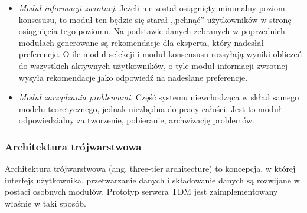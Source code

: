 \begin{itemize}
  \item \emph{Moduł informacji zwrotnej}. Jeżeli nie został osiągnięty minimalny
  poziom konsesusu, to moduł ten będzie się starał ,,pchnąć'' użytkowników w
  stronę osiągnięcia tego poziomu. Na podstawie danych zebranych w poprzednich
  modułach generowane są rekomendacje dla eksperta, który nadesłał preferencje.
  O ile moduł selekcji i moduł konsensusu rozsyłają wyniki obliczeń do
  wszystkich aktywnych użytkowników, o tyle moduł informacji zwrotnej wysyła
  rekomendacje jako odpowiedź na nadesłane preferencje.

  \item \emph{Moduł zarządzania problemami}. Część systemu niewchodząca w skład
  samego modelu teoretycznego, jednak niezbędna do pracy całości. Jest to moduł
  odpowiedzialny za tworzenie, pobieranie, archwizację problemów. 
   
\end{itemize}
\subsubsection{Architektura trójwarstwowa}
Architektura trójwarstwowa (ang. three-tier architecture) to koncepcja, w której
interfejs użytkownika, przetwarzanie danych i składowanie danych są rozwijane w
postaci osobnych modułów. Prototyp serwera TDM jest zaimplementowany właśnie w
taki sposób.

